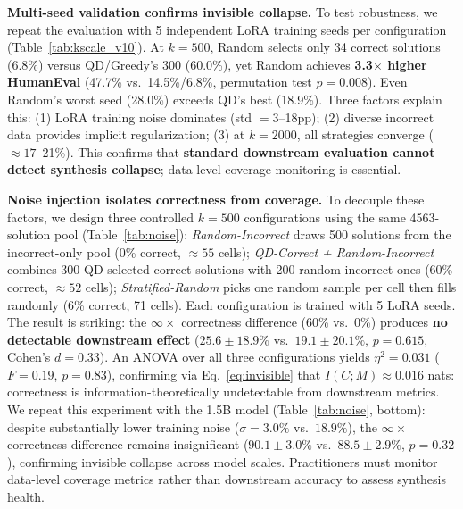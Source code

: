 \documentclass{article}
\begin{document}
\begin{enumerate}[nosep]
\textbf{Multi-seed validation confirms invisible collapse.}
To test robustness, we repeat the evaluation with 5 independent LoRA training seeds per configuration (Table~\ref{tab:kscale_v10}).
At $k{=}500$, Random selects only 34 correct solutions (6.8\%) versus QD/Greedy's 300 (60.0\%), yet Random achieves \textbf{3.3$\times$ higher HumanEval} (47.7\% vs.\ 14.5\%/6.8\%, permutation test $p{=}0.008$).
Even Random's worst seed (28.0\%) exceeds QD's best (18.9\%).
Three factors explain this: (1) LoRA training noise dominates (std $= 3$--18pp); (2) diverse incorrect data provides implicit regularization; (3) at $k{=}2000$, all strategies converge (${\approx}17$--21\%).
This confirms that \textbf{standard downstream evaluation cannot detect synthesis collapse}; data-level coverage monitoring is essential.

\textbf{Noise injection isolates correctness from coverage.}
To decouple these factors, we design three controlled $k{=}500$ configurations using the same 4563-solution pool (Table~\ref{tab:noise}):
\emph{Random-Incorrect} draws 500 solutions from the incorrect-only pool (0\% correct, ${\approx}55$ cells);
\emph{QD-Correct + Random-Incorrect} combines 300 QD-selected correct solutions with 200 random incorrect ones (60\% correct, ${\approx}52$ cells);
\emph{Stratified-Random} picks one random sample per cell then fills randomly (6\% correct, 71 cells).
Each configuration is trained with 5 LoRA seeds.
The result is striking: the $\infty\times$ correctness difference (60\% vs.\ 0\%) produces \textbf{no detectable downstream effect} ($25.6{\pm}18.9\%$ vs.\ $19.1{\pm}20.1\%$, $p{=}0.615$, Cohen's $d{=}0.33$).
An ANOVA over all three configurations yields $\eta^2{=}0.031$ ($F{=}0.19$, $p{=}0.83$), confirming via Eq.~\ref{eq:invisible} that $I(C; M) \approx 0.016$ nats: correctness is information-theoretically undetectable from downstream metrics.
We repeat this experiment with the 1.5B model (Table~\ref{tab:noise}, bottom): despite substantially lower training noise ($\sigma{=}3.0\%$ vs.\ $18.9\%$), the $\infty\times$ correctness difference remains insignificant ($90.1{\pm}3.0\%$ vs.\ $88.5{\pm}2.9\%$, $p{=}0.32$), confirming invisible collapse across model scales.
Practitioners must monitor data-level coverage metrics rather than downstream accuracy to assess synthesis health.


\end{enumerate}
\end{document}
